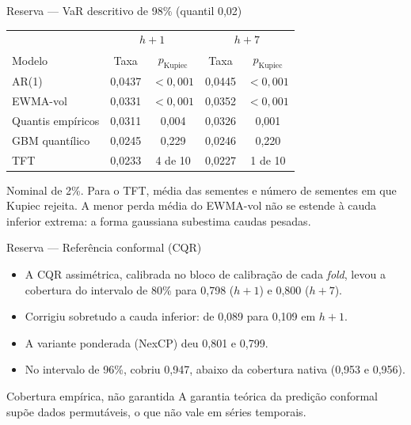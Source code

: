 \documentclass[aspectratio=169,10pt]{beamer}
\newcommand{\hum}{\(h{+}1\)}
\newcommand{\hsete}{\(h{+}7\)}
\begin{document}
\begin{frame}{Reserva --- VaR descritivo de 98\% (quantil 0,02)}
  \centering\small
  \begin{tabular}{l c c c c}
    \toprule
    & \multicolumn{2}{c}{\hum} & \multicolumn{2}{c}{\hsete} \\
    Modelo & Taxa & \(p_{\text{Kupiec}}\) & Taxa & \(p_{\text{Kupiec}}\) \\
    \midrule
    AR(1) & 0,0437 & \(<0{,}001\) & 0,0445 & \(<0{,}001\) \\
    EWMA-vol & 0,0331 & \(<0{,}001\) & 0,0352 & \(<0{,}001\) \\
    Quantis empíricos & 0,0311 & 0,004 & 0,0326 & 0,001 \\
    GBM quantílico & 0,0245 & 0,229 & 0,0246 & 0,220 \\
    TFT & 0,0233 & 4 de 10 & 0,0227 & 1 de 10 \\
    \bottomrule
  \end{tabular}

  \vspace{6pt}
  \raggedright
  Nominal de 2\%. Para o TFT, média das sementes e número de sementes em que Kupiec
  rejeita. A menor perda média do EWMA-vol não se estende à cauda inferior extrema: a forma
  gaussiana subestima caudas pesadas.
\end{frame}

\begin{frame}{Reserva --- Referência conformal (CQR)}
  \begin{itemize}
    \item A CQR assimétrica, calibrada no bloco de calibração de cada \textit{fold}, levou a
      cobertura do intervalo de 80\% para 0,798 (\hum) e 0,800 (\hsete).
    \item Corrigiu sobretudo a cauda inferior: de 0,089 para 0,109 em \hum.
    \item A variante ponderada (NexCP) deu 0,801 e 0,799.
    \item No intervalo de 96\%, cobriu 0,947, abaixo da cobertura nativa (0,953 e 0,956).
  \end{itemize}
  \vspace{4pt}
  \begin{alertblock}{Cobertura empírica, não garantida}
    A garantia teórica da predição conformal supõe dados permutáveis, o que não vale
    em séries temporais.
  \end{alertblock}
\end{frame}
\end{document}
